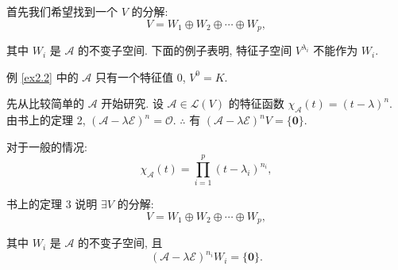 \documentclass[color=black,device=normal,lang=cn,mode=geye]{elegantnote}
\begin{document}
首先我们希望找到一个 $V$ 的分解:
\[V=W_1\oplus W_2\oplus\cdots\oplus W_p,\]

其中 $W_i$ 是 $\mathcal{A}$ 的不变子空间. 下面的例子表明, 特征子空间 $V^{\lambda_i}$ 不能作为 $W_i$.
\begin{example}
    例 \ref{ex2.2} 中的 $\mathcal{A}$ 只有一个特征值 $0$, $V^0=K$.
\end{example}

先从比较简单的 $\mathcal{A}$ 开始研究. 设 $\mathcal{A}\in\mathcal{L}(V)$ 的特征函数 $\chi_{\mathcal{A}}(t)=(t-\lambda)^n$. 由书上的定理 2, $(\mathcal{A}-\lambda\mathcal{E})^n=\mathcal{O}$. $\therefore$ 有 $(\mathcal{A}-\lambda\mathcal{E})^nV=\{\boldsymbol{0}\}$.

对于一般的情况:
\[\chi_{\mathcal{A}}(t)=\prod\limits_{i=1}^p(t-\lambda_i)^{n_i},\]

书上的定理 3 说明 $\exists V$ 的分解:
\[V=W_1\oplus W_2\oplus\cdots\oplus W_p,\]

其中 $W_i$ 是 $\mathcal{A}$ 的不变子空间, 且
\[(\mathcal{A}-\lambda\mathcal{E})^{n_i}W_i=\{\boldsymbol{0}\}.\]
\end{document}
